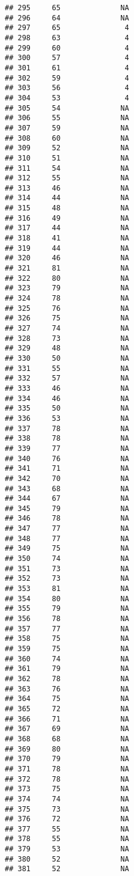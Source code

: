 \documentclass[]{article}
\begin{document}
\begin{verbatim}
## 295     65              NA
## 296     64              NA
## 297     65               4
## 298     63               4
## 299     60               4
## 300     57               4
## 301     61               4
## 302     59               4
## 303     56               4
## 304     53               4
## 305     54              NA
## 306     55              NA
## 307     59              NA
## 308     60              NA
## 309     52              NA
## 310     51              NA
## 311     54              NA
## 312     55              NA
## 313     46              NA
## 314     44              NA
## 315     48              NA
## 316     49              NA
## 317     44              NA
## 318     41              NA
## 319     44              NA
## 320     46              NA
## 321     81              NA
## 322     80              NA
## 323     79              NA
## 324     78              NA
## 325     76              NA
## 326     75              NA
## 327     74              NA
## 328     73              NA
## 329     48              NA
## 330     50              NA
## 331     55              NA
## 332     57              NA
## 333     46              NA
## 334     46              NA
## 335     50              NA
## 336     53              NA
## 337     78              NA
## 338     78              NA
## 339     77              NA
## 340     76              NA
## 341     71              NA
## 342     70              NA
## 343     68              NA
## 344     67              NA
## 345     79              NA
## 346     78              NA
## 347     77              NA
## 348     77              NA
## 349     75              NA
## 350     74              NA
## 351     73              NA
## 352     73              NA
## 353     81              NA
## 354     80              NA
## 355     79              NA
## 356     78              NA
## 357     77              NA
## 358     75              NA
## 359     75              NA
## 360     74              NA
## 361     79              NA
## 362     78              NA
## 363     76              NA
## 364     75              NA
## 365     72              NA
## 366     71              NA
## 367     69              NA
## 368     68              NA
## 369     80              NA
## 370     79              NA
## 371     78              NA
## 372     78              NA
## 373     75              NA
## 374     74              NA
## 375     73              NA
## 376     72              NA
## 377     55              NA
## 378     55              NA
## 379     53              NA
## 380     52              NA
## 381     52              NA

\end{verbatim}
\end{document}
